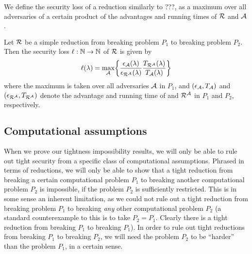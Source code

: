 We define the security loss of a reduction \redR similarly to ???,
as a maximum over all adversaries \advA of a certain product of the
advantages and running times of \(\redR\) and \(\mathcal{A}\).

\begin{definition}\label{def:loss}
  Let \(\redR\) be a simple reduction
  from breaking problem \(P_{1}\) to breaking problem \(P_{2}\).
  Then the security loss \(\ell : \mathbb{N} \to \mathbb{N}\) of \(\redR\) is given by
  \begin{equation}
    \ell(\lambda) = \max_{\advA} \left\{ \frac{\epsilon_{\advA}(\lambda)}{\epsilon_{\redR^{\advA}}(\lambda)}\frac{T_{\redR^{\advA}}(\lambda)}{T_{\advA}(\lambda)} \right\}
  \end{equation}
  where the maximum is taken over all adversaries \(\mathcal{A}\) in \(P_{1}\),
  and \((\epsilon_{\mathcal{A}}, T_{\mathcal{A}})\) and \((\epsilon_{\redR^{\advA}}, T_{\redR^{\advA}})\)
  denote the advantage and running time of \advA and \(\redR^{\advA}\) in \(P_{1}\) and \(P_{2}\), respectively.
\end{definition}




\subsection{Computational assumptions}

When we prove our tightness impossibility results,
we will only be able to rule out tight security
from a specific class of computational assumptions.
Phrased in terms of reductions,
we will only be able to show that a tight reduction
from breaking a certain computational problem \(P_1\)
to breaking another computational problem \(P_2\) is impossible,
if the problem \(P_2\) is sufficiently restricted.
This is in some sense an inherent limitation,
as we could not rule out a tight reduction from breaking problem \(P_1\)
to breaking \emph{any} other computational problem \(P_2\)
(a standard counterexample to this is to take \(P_2 = P_1\).
Clearly there is a tight reduction from breaking \(P_1\) to breaking \(P_1\)).
In order to rule out tight reductions from breaking \(P_1\) to breaking \(P_2\),
we will need the problem \(P_2\) to be ``harder''
than the problem \(P_1\), in a certain sense.

